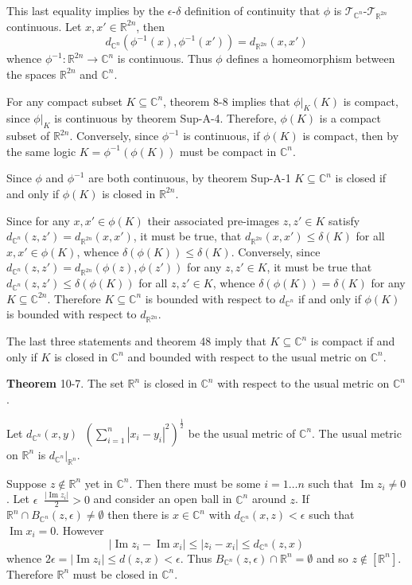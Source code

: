 \documentclass[a4paper]{article}
\newcommand{\clo}[1]{\left [ #1 \right ]}
\newcommand{\brac}[1]{\left ( #1 \right )}
\newcommand{\induc}[1]{\left . #1 \right \vert}
\newcommand{\abs}[1]{\left | #1 \right |}
\newcommand{\Real}{\mathbb{R}}
\newcommand{\Cplx}{\mathbb{C}}
\newcommand{\Tcal}{\mathcal{T}}
\newcommand{\defn}{\mathop{\overset{\Delta}{=}}\nolimits}
\newcommand{\im}{\operatorname{Im}\nolimits}
\begin{document}
This last equality implies by the $\epsilon$-$\delta$ definition of continuity that $\phi$ is $\Tcal_{\Cplx^n}$-$\Tcal_{\Real^{2n}}$ continuous. Let $x, x'\in \Real^{2n}$, then \[d_{\Cplx^n}\brac{\phi^{-1}\brac{x}, \phi^{-1}\brac{x'}} = d_{\Real^{2n}}\brac{ x, x' }\] whence $\phi^{-1}:\Real^{2n}\to \Cplx^n$ is continuous. Thus $\phi$ defines a homeomorphism between the spaces $\Real^{2n}$ and $\Cplx^n$.

For any compact subset $K\subseteq \Cplx^n$, theorem 8-8 implies that $\induc{\phi}_K\brac{K}$ is compact, since $\induc{\phi}_K$ is continuous by theorem Sup-A-4. Therefore, $\phi\brac{K}$ is a compact subset of $\Real^{2n}$. Conversely, since $\phi^{-1}$ is continuous, if $\phi\brac{K}$ is compact, then by the same logic $K=\phi^{-1}\brac{\phi\brac{K}}$ must be compact in $\Cplx^n$.

Since $\phi$ and $\phi^{-1}$ are both continuous, by theorem Sup-A-1 $K\subseteq \Cplx^n$ is closed if and only if $\phi\brac{K}$ is closed in $\Real^{2n}$.

Since for any $x,x'\in \phi\brac{K}$ their associated pre-images $z,z'\in K$ satisfy $d_{\Cplx^n}\brac{ z, z' }=d_{\Real^{2n}}\brac{ x, x' }$, it must be true, that $d_{\Real^{2n}}\brac{ x, x' }\leq \delta\brac{K}$ for all $x,x'\in \phi\brac{K}$, whence $\delta\brac{\phi\brac{K}}\leq \delta\brac{K}$. Conversely, since $d_{\Cplx^n}\brac{z, z'} = d_{\Real^{2n}}\brac{ \phi\brac{z}, \phi\brac{z'} }$ for any $z,z'\in K$, it must be true that $d_{\Cplx^n}\brac{z, z'}\leq \delta\brac{\phi\brac{K}}$ for all $z,z'\in K$, whence $\delta\brac{\phi\brac{K}}=\delta\brac{K}$ for any $K\subseteq \Cplx^{2n}$. Therefore $K\subseteq \Cplx^n$ is bounded with respect to $d_{\Cplx^n}$ if and only if $\phi\brac{K}$ is bounded with respect to $d_{\Real^{2n}}$.

The last three statements and theorem 48 imply that $K\subseteq \Cplx^n$ is compact if and only if $K$ is closed in $\Cplx^n$ and bounded with respect to the usual metric on $\Cplx^n$.

\label{thm:real_closed_in_cplx} \noindent \textbf{Theorem} 10-7.
The set $\Real^n$ is closed in $\Cplx^n$ with respect to the usual metric on $\Cplx^n$.

Let $d_{\Cplx^n}\brac{x,y}\defn \brac{ \sum_{i=1}^n \abs{x_i-y_i}^2 }^\frac{1}{2}$ be the usual metric of $\Cplx^n$. The usual metric on $\Real^n$ is $\induc{d_{\Cplx^n}}_{\Real^n}$.

Suppose $z\notin \Real^n$ yet in $\Cplx^n$. Then there must be some $i = 1\ldots n$ such that $\im z_i \neq 0$. Let $\epsilon\defn \frac{\abs{\im z_i}}{2}>0$ and consider an open ball in $\Cplx^n$ around $z$. If $\Real^n\cap B_{\Cplx^n}\brac{z, \epsilon}\neq \emptyset$ then there is $x\in \Cplx^n$ with $d_{\Cplx^n}\brac{x,z}<\epsilon$ such that $\im x_i = 0$. However \[\abs{\im z_i-\im x_i} \leq \abs{z_i-x_i}\leq d_{\Cplx^n}\brac{z,x}\] whence $2 \epsilon = \abs{\im z_i} \leq d\brac{z,x} < \epsilon$. Thus $B_{\Cplx^n}\brac{z, \epsilon}\cap \Real^n=\emptyset$ and so $z\notin \clo{\Real^n}$. Therefore $\Real^n$ must be closed in $\Cplx^n$.\\
\end{document}
